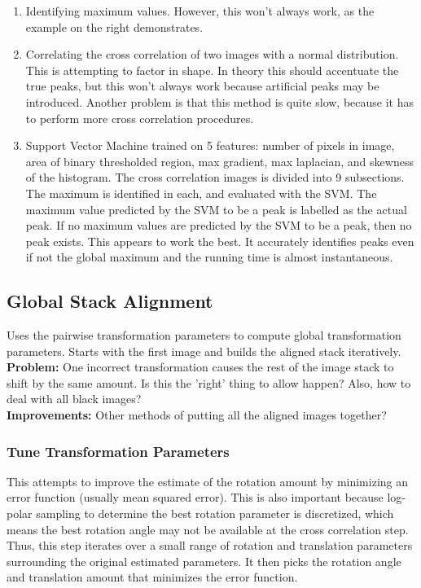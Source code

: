 \documentclass{article}
\begin{document}
\begin{enumerate}
\item Identifying maximum values. However, this won't always work, as the example on the right demonstrates.
\item Correlating the cross correlation of two images with a normal distribution. This is attempting to factor in shape. In theory this should accentuate the true peaks, but this won't always work because artificial peaks may be introduced. Another problem is that this method is quite slow, because it has to perform more cross correlation procedures. 
\item Support Vector Machine trained on 5 features: number of pixels in image, area of binary thresholded region, max gradient, max laplacian, and skewness of the histogram. The cross correlation images is divided into 9 subsections. The maximum is identified in each, and evaluated with the SVM. The maximum value predicted by the SVM to be a peak is labelled as the actual peak. If no maximum values are predicted by the SVM to be a peak, then no peak exists. This appears to work the best. It accurately identifies peaks even if not the global maximum and the running time is almost instantaneous.
\end{enumerate}

\subsection{Global Stack Alignment}
Uses the pairwise transformation parameters to compute global transformation parameters. Starts with the first image and builds the aligned stack iteratively. \\
\textbf{Problem:} One incorrect transformation causes the rest of the image stack to shift by the same amount. Is this the 'right' thing to allow happen? Also, how to deal with all black images? \\
\textbf{Improvements:} Other methods of putting all the aligned images together?

\subsubsection{Tune Transformation Parameters}
This attempts to improve the estimate of the rotation amount by minimizing an error function (usually mean squared error). This is also important because log-polar sampling to determine the best rotation parameter is discretized, which means the best rotation angle may not be available at the cross correlation step. Thus, this step iterates over a small range of rotation and translation parameters surrounding the original estimated parameters. It then picks the rotation angle and translation amount that minimizes the error function.
\end{document}
